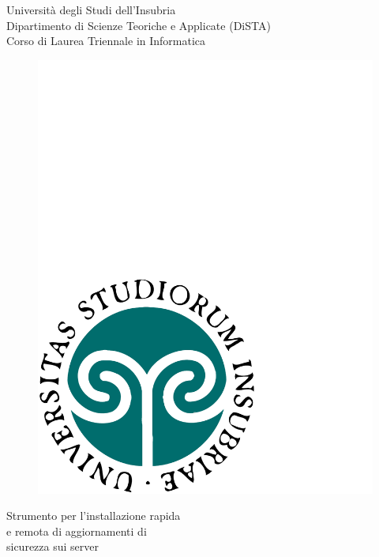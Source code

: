 \begin{titlepage}
  \begin{center}
    \begin{large}
      {\fontsize{20}{18}\selectfont\vspace*{0.50cm}Universit\`a degli Studi dell'Insubria}\\
      Dipartimento di Scienze Teoriche e Applicate (DiSTA)\\
      Corso di Laurea Triennale in Informatica
    \end{large}

    \vspace{1cm}
    \begin{figure}[h]
      \begin{center}
        \includegraphics[scale=0.25]{copertina/logounivector.pdf}
      \end{center}
    \end{figure}

      {
        \fontsize{26}{26}\selectfont\par\vspace*{0.75cm}
        Strumento per l'installazione rapida\\
        e remota di aggiornamenti di\\
        sicurezza sui server\\
      }
    \par


\end{center}
\end{titlepage}
